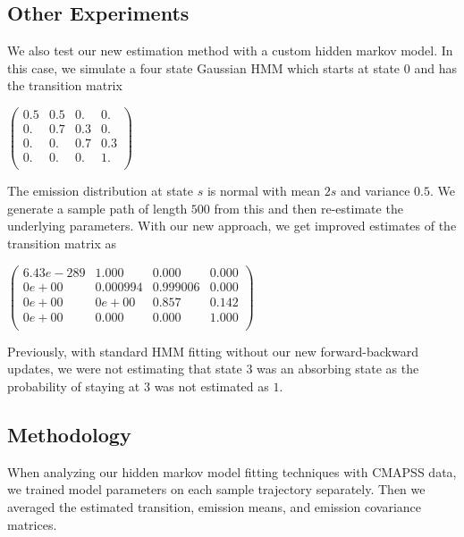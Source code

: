 \documentclass[english]{article}
\numberwithin{equation}{section}
\begin{document}
	\subsection*{Other Experiments}
	We also test our new estimation method with a custom hidden markov model. In this case, we simulate a four state Gaussian HMM which starts at state $0$ and has the transition matrix
	
	$\left(
	\begin{array}{cccc}
	0.5 & 0.5 & 0. & 0. \\
	0. & 0.7 & 0.3 & 0. \\
	0. & 0. & 0.7 & 0.3 \\
	0. & 0. & 0. & 1. \\
	\end{array}
	\right)$

	The emission distribution at state $s$ is normal with mean $2s$ and variance $0.5$. We generate a sample path of length $500$ from this and then re-estimate the underlying parameters. With our new approach, we get improved estimates of the transition matrix as

	$\left(
	\begin{array}{cccc}
	6.43e-289 & 1.000 & 0.000 & 0.000 \\ 
	0e+00 & 0.000994 & 0.999006 & 0.000 \\ 
	0e+00 & 0e+00 & 0.857 & 0.142 \\ 
	0e+00 & 0.000 & 0.000 & 1.000 \\ 
	\end{array} \right)$
	
Previously, with standard HMM fitting without our new forward-backward updates, we were not estimating that state $3$ was an absorbing state as the probability of staying at $3$ was not estimated as $1$.

\subsection*{Methodology}
When analyzing our hidden markov model fitting techniques with CMAPSS data, we trained model parameters on each sample trajectory separately. Then we averaged the estimated transition, emission means, and emission covariance matrices.
\end{document}
